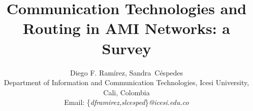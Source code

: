 \documentclass[11pt,final,onecolumn]{IEEEtran}
\begin{document}
%
\title{Communication Technologies and Routing in AMI Networks: a Survey}
%
%
%

\author{Diego F. Ram\'{i}rez, 
			 Sandra~C\'{e}spedes\\%
			 Department of Information and Communication Technologies, Icesi University, Cali, Colombia\\%
			 Email: \{\textit{dframirez,slcesped}\}\textit{@icesi.edu.co}}

%
%



%
\end{document}
